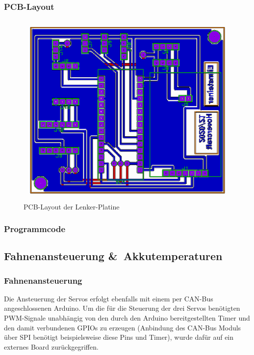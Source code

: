 \newpage

\subsubsection{PCB-Layout}
\begin{figure}[h]
    \centering
    \includegraphics[width=1.0\textwidth]{../Proteus/Exports/Lenker_Platine_PCB.png}    
    \caption{PCB-Layout der Lenker-Platine}
\end{figure}

\newpage
\subsubsection{Programmcode}


\newpage

\subsection{Fahnenansteuerung \&\ Akkutemperaturen\label{sec:Servoplatine}}
\subsubsection{Fahnenansteuerung}
Die Ansteuerung der Servos erfolgt ebenfalls mit einem per CAN-Bus angeschlossenen Arduino. Um die für die Steuerung der drei Servos benötigten PWM-Signale unabhängig von den durch den Arduino bereitgestellten Timer und den damit verbundenen GPIOs zu erzeugen 
(Anbindung des CAN-Bus Moduls über SPI benötigt beispielsweise diese Pins und Timer), wurde dafür auf ein externes Board zurückgegriffen.


